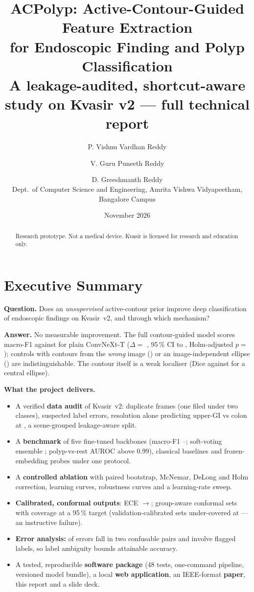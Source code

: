 \documentclass[11pt,a4paper,oneside]{report}
\title{\textbf{ACPolyp: Active-Contour-Guided Feature Extraction\\for Endoscopic Finding and Polyp Classification}\\[0.4em]
\large A leakage-audited, shortcut-aware study on Kvasir v2 --- full technical report}
\author{P. Vishnu Vardhan Reddy \and V. Guru Puneeth Reddy \and D. Greeshmanth Reddy\\[2pt]
Dept.\ of Computer Science and Engineering, Amrita Vishwa Vidyapeetham, Bangalore Campus}
\date{November 2026}
\begin{document}
\maketitle
\begin{abstract}
\noindent Research prototype. Not a medical device. Kvasir is licensed for research and education only.
\end{abstract}
\tableofcontents

\chapter*{Executive Summary}
\textbf{Question.} Does an \emph{unsupervised} active-contour prior improve deep classification of endoscopic findings on Kvasir~v2, and through which mechanism?

\textbf{Answer.} No measurable improvement. The full contour-guided model scores macro-F1 \acgF{} against \plainF{} for plain ConvNeXt-T
($\Delta=$ \acgDelta{}, 95\,\% CI \acgDeltaLo{} to \acgDeltaHi{}, Holm-adjusted $p=$ \acgPHolm{}); controls with contours from the \emph{wrong} image (\shufDelta{}) or an image-independent ellipse (\ellDelta{}) are indistinguishable.
The contour itself is a weak localiser (Dice \acDice{} against \ellDice{} for a central ellipse).

\textbf{What the project delivers.}
\begin{itemize}
\item A verified \textbf{data audit} of Kvasir~v2: \nDropped{} duplicate frames (one filed under two classes), \flaggedPct{} suspected label errors, resolution alone predicting upper-GI vs colon at \resOnlyAcc{}, a scene-grouped leakage-aware split.
\item A \textbf{benchmark} of five fine-tuned backbones (macro-F1 \resnetF{}--\dinoF{}; soft-voting ensemble \ensF{}; polyp-vs-rest AUROC above 0.99), classical baselines and frozen-embedding probes under one protocol.
\item A \textbf{controlled ablation} with paired bootstrap, McNemar, DeLong and Holm correction, learning curves, robustness curves and a learning-rate sweep.
\item \textbf{Calibrated, conformal outputs}: ECE \eceRaw{}$\to$\eceCal{}; group-aware conformal sets with \confCov{} coverage at a 95\,\% target (validation-calibrated sets under-covered at \confCovVal{} --- an instructive failure).
\item \textbf{Error analysis:} \errPairs{} of errors fall in two confusable pairs and \errFlagged{} involve flagged labels, so label ambiguity bounds attainable accuracy.
\item A tested, reproducible \textbf{software package} (48 tests, one-command pipeline, versioned model bundle), a local \textbf{web application}, an IEEE-format \textbf{paper}, this report and a slide deck.
\end{itemize}
\end{document}
